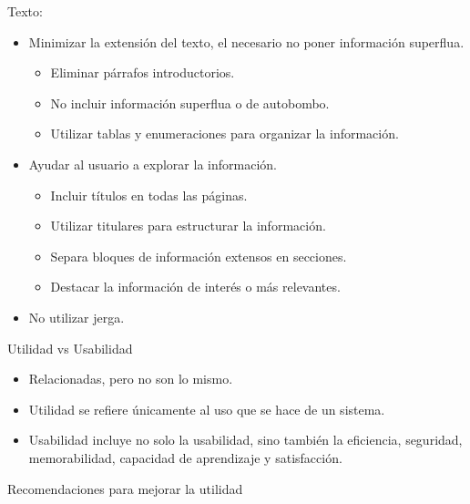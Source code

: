 \documentclass[12pt, twoside, openright]{report} %
\begin{document}
Texto:
\begin{itemize}
	\item Minimizar la extensión del texto, el necesario no poner información superflua.
	      \begin{itemize}
		      \item Eliminar párrafos introductorios.

		      \item No incluir información superflua o de autobombo.

		      \item Utilizar tablas y enumeraciones para organizar la información.
	      \end{itemize}

	\item Ayudar al usuario a explorar la información.
	      \begin{itemize}
		      \item Incluir títulos en todas las páginas.

		      \item Utilizar titulares para estructurar la información.

		      \item Separa bloques de información extensos en secciones.

		      \item Destacar la información de interés o más relevantes.
	      \end{itemize}

	\item No utilizar jerga.
\end{itemize}



Utilidad vs Usabilidad
\begin{itemize}
	\item Relacionadas, pero no son lo mismo.
	\item Utilidad se refiere únicamente al uso que se hace de un sistema.
	\item Usabilidad incluye no solo la usabilidad, sino también la
	      eficiencia, seguridad, memorabilidad, capacidad de aprendizaje y
	      satisfacción.
\end{itemize}
\pagebreak

Recomendaciones para mejorar la utilidad
\end{document}
